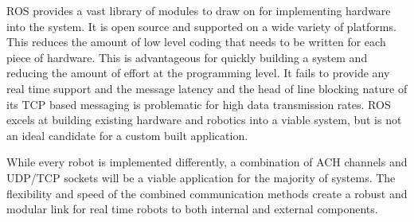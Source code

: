 ROS provides a vast library of modules to draw on for implementing hardware into the system. It is open source and supported on a wide variety of platforms. This reduces the amount of low level coding that needs to be written for each piece of hardware. This is advantageous for quickly building a system and reducing the amount of effort at the programming level. It fails to provide any real time support and the message latency and the head of line blocking nature of its TCP based messaging is problematic for high data transmission rates. ROS excels at building existing hardware and robotics into a viable system, but is not an ideal candidate for a custom built application.

While every robot is implemented differently, a combination of ACH channels and UDP/TCP sockets will be a viable application for the majority of systems. The flexibility and speed of the combined communication methods create a robust and modular link for real time robots to both internal and external components. 
